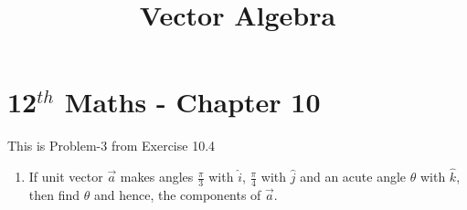 \documentclass[12pt]{article}
\begin{document}
\begin{center}
\enlargethispage{-4cm}
\title{\textbf{Vector Algebra}}
\date{\vspace{-5ex}} %
\maketitle
\end{center}
\setcounter{page}{1}
\section*{12$^{th}$ Maths - Chapter 10}
This is Problem-3 from Exercise 10.4
\begin{enumerate}
\item If unit vector $\overrightarrow{a}$ makes angles $\frac{\pi}{3}$ with $\hat{i}$, $\frac{\pi}{4}$ with $\hat{j}$ and an acute angle $\theta$ with $\hat{k}$, then find $\theta$ and hence, the components of $\overrightarrow{a}$.


\end{enumerate}
\end{document}
